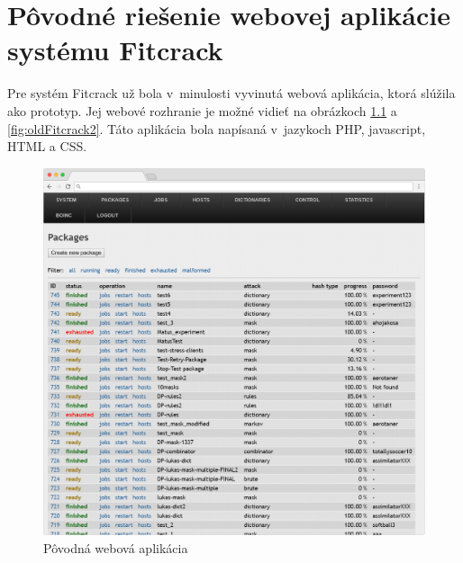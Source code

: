 \documentclass[slovak]{fitthesis}
\begin{document}
\chapter{Pôvodné riešenie webovej aplikácie systému Fitcrack}
Pre systém Fitcrack už bola v~minulosti vyvinutá webová aplikácia, ktorá slúžila ako prototyp. Jej webové rozhranie je možné vidieť na obrázkoch \ref{fig:oldFitcrack} a  \ref{fig:oldFitcrack2}. Táto aplikácia bola napísaná v~jazykoch PHP, javascript, HTML a CSS.
\begin{figure}[H]
    \centering
    \includegraphics[scale=0.3]{obrazky/oldWebadminFrame.PNG}
    \caption{Pôvodná webová aplikácia}
    \label{fig:oldFitcrack}
\end{figure}
\end{document}
